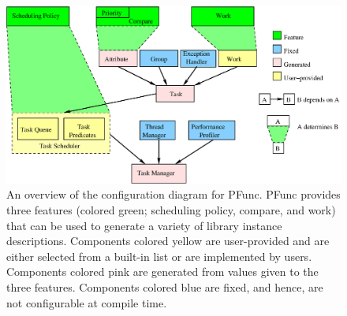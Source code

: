 \begin{figure}
\centering
\includegraphics[width=1.0\textwidth]{figs/custom}
\caption{An overview of the configuration diagram for PFunc. PFunc provides
three features (colored green; scheduling policy, compare, and work) that can
be used to generate a variety of library instance descriptions.  Components
colored yellow are user-provided and are either selected from a built-in list
or are implemented by users. Components colored pink are generated from values
given to the three features. Components colored blue are fixed, and hence, are 
not configurable at compile time.}
\label{fig:custom}
\end{figure}

